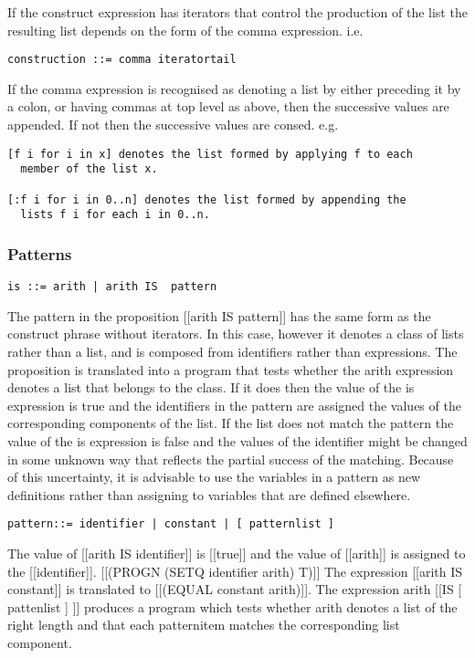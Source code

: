 \documentclass{article}
\begin{document}
If the construct expression has iterators that control the production
of the list the resulting list depends on the form of the comma
expression.
i.e.
\begin{verbatim} 
construction ::= comma iteratortail
\end{verbatim} 

If the comma expression is recognised as denoting a list
by either preceding it by a colon, or having commas at top level
as above, then the successive values are appended.  If not then
the successive values are consed.
e.g.
\begin{verbatim} 
[f i for i in x] denotes the list formed by applying f to each
  member of the list x.
 
[:f i for i in 0..n] denotes the list formed by appending the
  lists f i for each i in 0..n.
\end{verbatim} 

\subsubsection{Patterns}
\label{sec:boot:pattern}

\begin{verbatim}  
is ::= arith | arith IS  pattern
\end{verbatim} 

The pattern in the proposition [[arith IS pattern]] has the same form
as the construct phrase without iterators. In this case, however it
denotes a class of lists rather than a list, and is composed
from identifiers rather than expressions.  The proposition
is translated into a program that tests whether the arith expression
denotes a list that belongs to the class. If it does then the value
of the is expression is true and the identifiers in
the pattern are assigned the values of the corresponding
components of the list. If the list does not match the pattern
the value of the is expression is false and the values of the
identifier might be changed in some unknown way that reflects the
partial success of the matching.
Because of this uncertainty,
it is advisable to use the variables in a pattern
as new definitions rather than assigning to variables that are
defined elsewhere.
\begin{verbatim}  
pattern::= identifier | constant | [ patternlist ]
\end{verbatim} 

The value of [[arith IS identifier]] is [[true]] and the value of 
[[arith]] is assigned to the [[identifier]].
[[(PROGN (SETQ identifier arith) T)]]
The expression [[arith IS constant]] is translated to 
[[(EQUAL constant arith)]].
The expression arith [[IS [ pattenlist ] ]]
produces a program which tests whether arith denotes a list
of the right length and that each patternitem matches the corresponding
list component.
 
\end{document}
